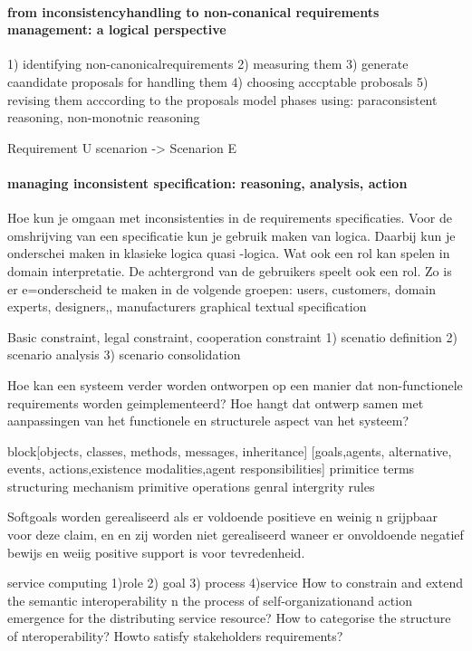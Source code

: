 \paragraph{from inconsistencyhandling to non-conanical requirements management: a logical perspective}

1) identifying non-canonicalrequirements
2) measuring them
3) generate caandidate proposals for handling them
4) choosing acccptable probosals
5) revising them acccording to the proposals
model phases using: paraconsistent reasoning, non-monotnic reasoning

Requirement U scenarion -> Scenarion E


\paragraph{managing inconsistent specification: reasoning, analysis, action}
Hoe kun je omgaan met inconsistenties in de requirements specificaties.
Voor de omshrijving van een specificatie kun je gebruik maken van logica. Daarbij kun je onderschei maken in klasieke logica quasi -logica.
Wat ook een rol kan spelen in domain interpretatie. De achtergrond van de gebruikers speelt ook een rol.
Zo is er e=onderscheid te maken in de volgende groepen: users, customers, domain experts, designers,, manufacturers
graphical  textual specification

Basic constraint, legal constraint, cooperation constraint
1) scenatio  definition
2) scenario analysis
3) scenario consolidation


Hoe kan een systeem verder worden ontworpen op een manier dat non-functionele requirements worden geimplementeerd?
Hoe hangt dat ontwerp samen met aanpassingen van het functionele en structurele aspect van het systeem?

block[objects, classes, methods, messages, inheritance]
[goals,agents, alternative, events, actions,existence modalities,agent responsibilities]
primitice terms
structuring mechanism
primitive operations
genral intergrity rules

 
Softgoals worden gerealiseerd als er voldoende positieve en weinig n grijpbaar voor deze claim, en en zij worden niet gerealiseerd waneer er onvoldoende negatief bewijs  en weiig positive support is voor tevredenheid.


service computing
1)role
2) goal
3) process
4)service
How to constrain and extend the semantic interoperability n the process of self-organizationand action emergence for the distributing service resource?
How to categorise the  structure of nteroperability?
Howto satisfy stakeholders requirements?


